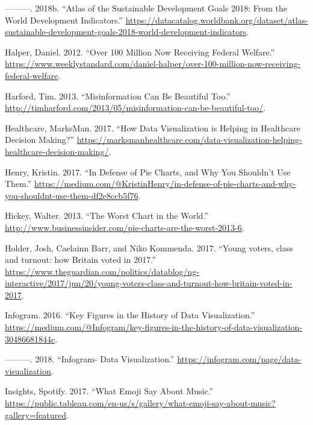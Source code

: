 \documentclass[]{book}
\begin{document}
\hypertarget{ref-data_access}{}
---------. 2018b. ``Atlas of the Sustainable Development Goals 2018:
From the World Development Indicators.''
\url{https://datacatalog.worldbank.org/dataset/atlas-sustainable-development-goals-2018-world-development-indicators}.

\hypertarget{ref-halper_2012}{}
Halper, Daniel. 2012. ``Over 100 Million Now Receiving Federal
Welfare.''
\url{https://www.weeklystandard.com/daniel-halper/over-100-million-now-receiving-federal-welfare}.

\hypertarget{ref-harford-misinformation}{}
Harford, Tim. 2013. ``Misinformation Can Be Beautiful Too.''
\url{http://timharford.com/2013/05/misinformation-can-be-beautiful-too/}.

\hypertarget{ref-marksman}{}
Healthcare, MarksMan. 2017. ``How Data Visualization is Helping in
Healthcare Decision Making?''
\url{https://marksmanhealthcare.com/data-visualization-helping-healthcare-decision-making/}.

\hypertarget{ref-henry-defense-pie}{}
Henry, Kristin. 2017. ``In Defense of Pie Charts, and Why You Shouldn't
Use Them.''
\url{https://medium.com/@KristinHenry/in-defense-of-pie-charts-and-why-you-shouldnt-use-them-df2e8ccb5f76}.

\hypertarget{ref-hickey-pie-worst}{}
Hickey, Walter. 2013. ``The Worst Chart in the World.''
\url{http://www.businessinsider.com/pie-charts-are-the-worst-2013-6}.

\hypertarget{ref-UKvotes2017}{}
Holder, Josh, Caelainn Barr, and Niko Kommenda. 2017. ``Young voters,
class and turnout: how Britain voted in 2017.''
\url{https://www.theguardian.com/politics/datablog/ng-interactive/2017/jun/20/young-voters-class-and-turnout-how-britain-voted-in-2017}.

\hypertarget{ref-history_viz}{}
Infogram. 2016. ``Key Figures in the History of Data Visualization.''
\href{\%20https://medium.com/@Infogram/key-figures-in-the-history-of-data-visualization-30486681844c}{https://medium.com/@Infogram/key-figures-in-the-history-of-data-visualization-30486681844c}.

\hypertarget{ref-infogram}{}
---------. 2018. ``Infogram- Data Visualization.''
\href{\%20https://infogram.com/page/data-visualization}{https://infogram.com/page/data-visualization}.

\hypertarget{ref-artist_emoji}{}
Insights, Spotify. 2017. ``What Emoji Say About Music.''
\url{https://public.tableau.com/en-us/s/gallery/what-emoji-say-about-music?gallery=featured}.
\end{document}
